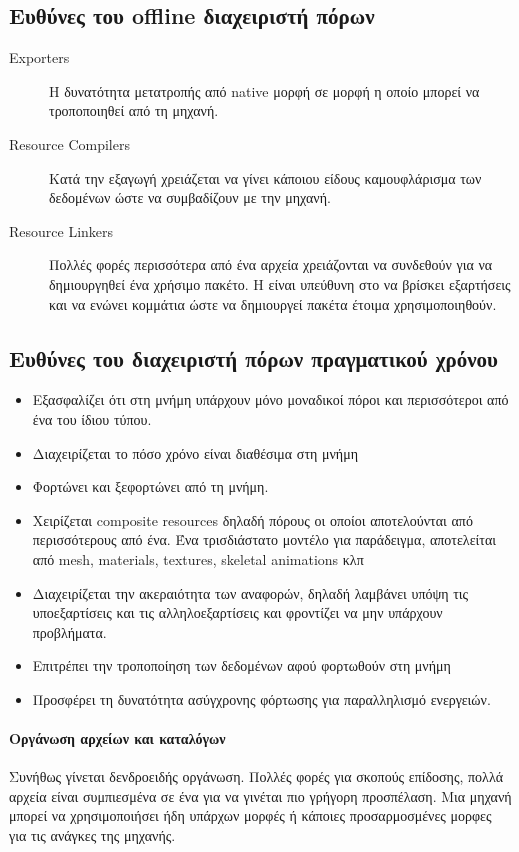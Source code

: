 \subsection{Ευθύνες του offline διαχειριστή πόρων}
\begin{description}
\item [Exporters]  Η δυνατότητα μετατροπής από native μορφή σε μορφή η οποίο μπορεί να τροποποιηθεί από τη μηχανή.
\item [Resource Compilers] Κατά την εξαγωγή χρειάζεται να γίνει κάποιου είδους καμουφλάρισμα των δεδομένων ώστε να συμβαδίζουν με την μηχανή.
\item [Resource Linkers] Πολλές φορές περισσότερα από ένα αρχεία χρειάζονται να συνδεθούν για να δημιουργηθεί ένα χρήσιμο πακέτο. Η είναι υπεύθυνη στο να βρίσκει εξαρτήσεις και να ενώνει κομμάτια ώστε να δημιουργεί πακέτα έτοιμα χρησιμοποιηθούν.
\end{description}

\subsection{Ευθύνες του διαχειριστή πόρων πραγματικού χρόνου}
\begin{itemize}
\item Εξασφαλίζει ότι στη μνήμη υπάρχουν μόνο μοναδικοί πόροι και περισσότεροι από ένα του ίδιου τύπου.
\item Διαχειρίζεται το πόσο χρόνο είναι διαθέσιμα στη μνήμη
\item Φορτώνει και ξεφορτώνει από τη μνήμη.
\item Χειρίζεται composite resources δηλαδή πόρους οι οποίοι αποτελούνται από περισσότερους από ένα. Ένα τρισδιάστατο μοντέλο για παράδειγμα, αποτελείται από mesh, materials, textures, skeletal animations κλπ
\item Διαχειρίζεται την ακεραιότητα των αναφορών, δηλαδή λαμβάνει υπόψη τις υποεξαρτίσεις και τις αλληλοεξαρτίσεις και φροντίζει να μην υπάρχουν προβλήματα.
\item Επιτρέπει την τροποποίηση των δεδομένων αφού φορτωθούν στη μνήμη
\item Προσφέρει τη δυνατότητα ασύγχρονης φόρτωσης για παραλληλισμό ενεργειών.
\end{itemize}

\paragraph{Οργάνωση αρχείων και καταλόγων}
Συνήθως γίνεται δενδροειδής οργάνωση. Πολλές φορές για σκοπούς επίδοσης, πολλά αρχεία είναι συμπιεσμένα σε ένα για να γινέται πιο γρήγορη προσπέλαση. Μια μηχανή μπορεί να χρησιμοποιήσει ήδη υπάρχων μορφές ή κάποιες προσαρμοσμένες μορφες για τις ανάγκες της μηχανής. 

